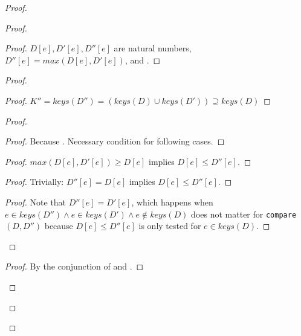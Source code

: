 \documentclass[9pt, oneside]{article}   	%
\begin{document}
\begin{proof}
\begin{proof}
		\begin{proof}
			$D[e], D'[e], D''[e]$ are natural numbers, $D''[e] = \textit{max}(D[e], D'[e])$, and .
		\end{proof}
		
		\begin{proof}
			\begin{proof}
				$K'' = \textit{keys}(D'') = (\textit{keys}(D) \cup \textit{keys}(D')) \supseteq \textit{keys}(D)$
			\end{proof}
		
			\begin{proof}
				\begin{proof}
					Because . Necessary condition for following cases.
				\end{proof}
				
				\begin{proof}
					$\textit{max}(D[e], D'[e]) \geq D[e]$ implies $D[e] \leq D''[e]$.
				\end{proof}
				
				\begin{proof}
					Trivially: $D''[e] = D[e]$ implies $D[e] \leq D''[e]$.
				\end{proof}
				
				\qedstep
				\begin{proof}
				 	Note that $D''[e] = D'[e]$, which happens when $e \in \textit{keys}(D'') \wedge e \in \textit{keys}(D') \wedge e \notin \textit{keys}(D)$ does not matter for \texttt{compare}$(D, D'')$ because $D[e] \leq D''[e]$ is only tested for $e \in \textit{keys}(D)$.
				\end{proof}
			\end{proof}
			
			\qedstep
			\begin{proof}
				By the conjunction of  and .
			\end{proof}
		\end{proof}
		

\end{proof}
\end{proof}
\end{document}
